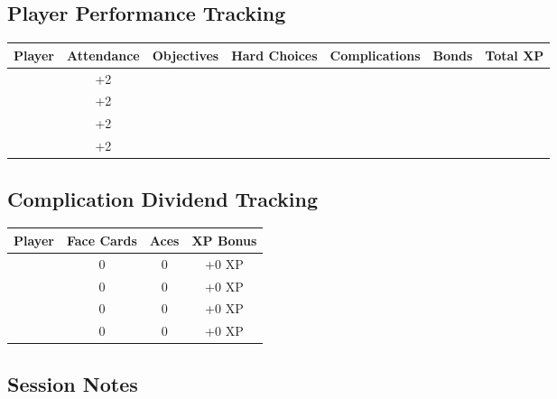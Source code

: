 \documentclass[11pt,letterpaper]{article}
\begin{document}
\subsection{Player Performance Tracking}

\begin{tabularx}{\textwidth}{|l|c|c|c|c|c|c|}
\hline
\textbf{Player} & \textbf{Attendance} & \textbf{Objectives} & \textbf{Hard Choices} & \textbf{Complications} & \textbf{Bonds} & \textbf{Total XP} \\
\hline
& +2 & & & & & \\
& +2 & & & & & \\
& +2 & & & & & \\
& +2 & & & & & \\
\hline
\end{tabularx}

\subsection{Complication Dividend Tracking}

\begin{tabularx}{\textwidth}{|l|c|c|c|}
\hline
\textbf{Player} & \textbf{Face Cards} & \textbf{Aces} & \textbf{XP Bonus} \\
\hline
& 0 & 0 & +0 XP \\
& 0 & 0 & +0 XP \\
& 0 & 0 & +0 XP \\
& 0 & 0 & +0 XP \\
\hline
\end{tabularx}

\subsection{Session Notes}

\vspace{10cm}
\end{document}
